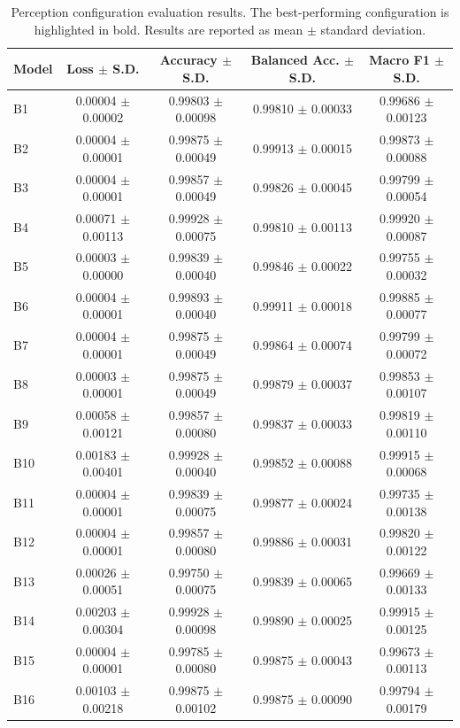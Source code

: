 \begin{table}[t]
\centering
\begin{tabular}{l c c c c}
\toprule
Model & Loss $\pm$ S.D. & Accuracy $\pm$ S.D. & Balanced Acc. $\pm$ S.D. & Macro F1 $\pm$ S.D. \\
\midrule
B1 & 0.00004 $\pm$ 0.00002 & 0.99803 $\pm$ 0.00098 & 0.99810 $\pm$ 0.00033 & 0.99686 $\pm$ 0.00123 \\
B2 & 0.00004 $\pm$ 0.00001 & 0.99875 $\pm$ 0.00049 & 0.99913 $\pm$ 0.00015 & 0.99873 $\pm$ 0.00088 \\
B3 & 0.00004 $\pm$ 0.00001 & 0.99857 $\pm$ 0.00049 & 0.99826 $\pm$ 0.00045 & 0.99799 $\pm$ 0.00054 \\
B4 & 0.00071 $\pm$ 0.00113 & 0.99928 $\pm$ 0.00075 & 0.99810 $\pm$ 0.00113 & 0.99920 $\pm$ 0.00087 \\
B5 & 0.00003 $\pm$ 0.00000 & 0.99839 $\pm$ 0.00040 & 0.99846 $\pm$ 0.00022 & 0.99755 $\pm$ 0.00032 \\
B6 & 0.00004 $\pm$ 0.00001 & 0.99893 $\pm$ 0.00040 & 0.99911 $\pm$ 0.00018 & 0.99885 $\pm$ 0.00077 \\
B7 & 0.00004 $\pm$ 0.00001 & 0.99875 $\pm$ 0.00049 & 0.99864 $\pm$ 0.00074 & 0.99799 $\pm$ 0.00072 \\
B8 & 0.00003 $\pm$ 0.00001 & 0.99875 $\pm$ 0.00049 & 0.99879 $\pm$ 0.00037 & 0.99853 $\pm$ 0.00107 \\
B9 & 0.00058 $\pm$ 0.00121 & 0.99857 $\pm$ 0.00080 & 0.99837 $\pm$ 0.00033 & 0.99819 $\pm$ 0.00110 \\
B10 & 0.00183 $\pm$ 0.00401 & 0.99928 $\pm$ 0.00040 & 0.99852 $\pm$ 0.00088 & 0.99915 $\pm$ 0.00068 \\
B11 & 0.00004 $\pm$ 0.00001 & 0.99839 $\pm$ 0.00075 & 0.99877 $\pm$ 0.00024 & 0.99735 $\pm$ 0.00138 \\
B12 & 0.00004 $\pm$ 0.00001 & 0.99857 $\pm$ 0.00080 & 0.99886 $\pm$ 0.00031 & 0.99820 $\pm$ 0.00122 \\
B13 & 0.00026 $\pm$ 0.00051 & 0.99750 $\pm$ 0.00075 & 0.99839 $\pm$ 0.00065 & 0.99669 $\pm$ 0.00133 \\
B14 & 0.00203 $\pm$ 0.00304 & 0.99928 $\pm$ 0.00098 & 0.99890 $\pm$ 0.00025 & 0.99915 $\pm$ 0.00125 \\
B15 & 0.00004 $\pm$ 0.00001 & 0.99785 $\pm$ 0.00080 & 0.99875 $\pm$ 0.00043 & 0.99673 $\pm$ 0.00113 \\
B16 & 0.00103 $\pm$ 0.00218 & 0.99875 $\pm$ 0.00102 & 0.99875 $\pm$ 0.00090 & 0.99794 $\pm$ 0.00179 \\
\bottomrule
\end{tabular}
\caption{Perception configuration evaluation results. The best-performing configuration is highlighted in bold. Results are reported as mean $\pm$ standard deviation.}
\label{tab:perception_results}
\end{table}